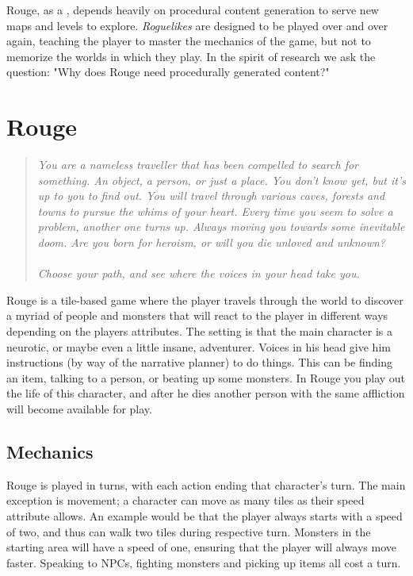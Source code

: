 Rouge, as a \rogue, depends heavily on procedural content generation to serve new maps and levels to explore. \textit{Roguelikes} are designed to be played over and over again, teaching the player to master the mechanics of the game, but not to memorize the worlds in which they play. In the spirit of research we ask the question: "Why does Rouge need procedurally generated content?"

\section{Rouge}
\label{sec:PCG:Rouge}
\begin{quotation}
\textsl{You are a nameless traveller that has been compelled to search for something.
An object, a person, or just a place.
You don't know yet, but it's up to you to find out.
You will travel through various caves, forests and towns to pursue the whims of your heart.
Every time you seem to solve a problem, another one turns up.
Always moving you towards some inevitable doom.
Are you born for heroism, or will you die unloved and unknown?
\\\\
Choose your path, and see where the voices in your head take you.}
\end{quotation}
Rouge is a tile-based \rogue game where the player travels through the world to discover a myriad of people and monsters that will react to the player in different ways depending on the players attributes. 
The setting is that the main character is a neurotic, or maybe even a little insane, adventurer.
Voices in his head give him instructions (by way of the narrative planner) to do things.
This can be finding an item, talking to a person, or beating up some monsters. 
In Rouge you play out the life of this character, and after he dies another person with the same affliction will become available for play. 

\subsection{Mechanics}
Rouge is played in turns, with each action ending that character's turn. 
The main exception is movement; a character can move as many tiles as their speed attribute allows. 
An example would be that the player always starts with a speed of two, and thus can walk two tiles during \his respective turn. 
Monsters in the starting area will have a speed of one, ensuring that the player will always move faster. 
Speaking to NPCs, fighting monsters and picking up items all cost a turn. 


